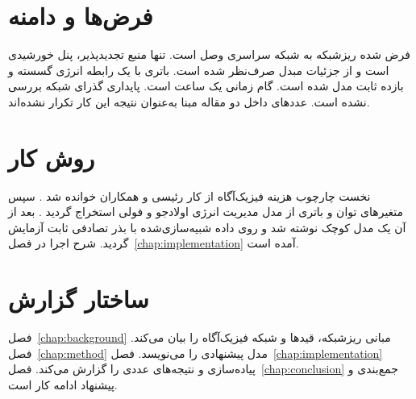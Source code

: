 \section{فرض‌ها و دامنه}
فرض شده ریزشبکه به شبکه سراسری وصل است. تنها منبع تجدیدپذیر، پنل خورشیدی است و از جزئیات مبدل صرف‌نظر شده است. باتری با یک رابطه انرژی گسسته و بازده ثابت مدل شده است. گام زمانی یک ساعت است. پایداری گذرای شبکه بررسی نشده است. عددهای داخل دو مقاله مبنا به‌عنوان نتیجه این کار تکرار نشده‌اند.

\section{روش کار}
نخست چارچوب هزینه فیزیک‌آگاه از کار رئیسی و همکاران خوانده شد . سپس متغیرهای توان و باتری از مدل مدیریت انرژی اولادجو و فولی استخراج گردید . بعد از آن یک مدل کوچک نوشته شد و روی داده شبیه‌سازی‌شده با بذر تصادفی ثابت آزمایش گردید. شرح اجرا در فصل~\ref{chap:implementation} آمده است.

\section{ساختار گزارش}
فصل~\ref{chap:background} مبانی ریزشبکه، قیدها و شبکه فیزیک‌آگاه را بیان می‌کند. فصل~\ref{chap:method} مدل پیشنهادی را می‌نویسد. فصل~\ref{chap:implementation} پیاده‌سازی و نتیجه‌های عددی را گزارش می‌کند. فصل~\ref{chap:conclusion} جمع‌بندی و پیشنهاد ادامه کار است.
